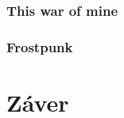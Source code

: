 \documentclass[10pt,oneoside,slovak,a4paper]{article}
\begin{document}
\subsubsection{This war of mine}


\subsubsection{Frostpunk}


\section{Záver} \label{zaver} %




\newpage

\end{document}

